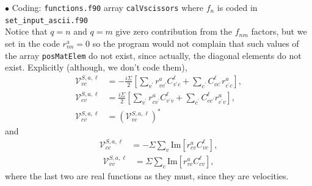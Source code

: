 $\bullet$ Coding: \verb=functions.f90= array \verb=calVscissors= 
where $f_n$ is coded in \verb=set_input_ascii.f90=\\
Notice that $q=n$ and $q=m$ give zero contribution from the $f_{nm}$
factors, but we set in the code $r^\mathrm{a}_{nn}=0$ so the program would
not complain that such values of the array \verb=posMatElem= do not
exist, since actually, the diagonal elements do not exist.
Explicitly (although, we don't code them), 
\begin{align}\label{vs.vc}
      \mathcal{V}^{S,a,\ell}_{vc}
&= 
      -\frac{i\Sigma}{2}
      \left[\sum_{v^{\prime}}r^{a}_{vv^{\prime}}C^{\ell}_{v^{\prime}c} 
          +
          \sum_{c^{\prime}}C^{\ell}_{vc^{\prime}}r^{a}_{c^{\prime}c}\right],
\nonumber\\
      \mathcal{V}^{S,a,\ell}_{cv}
&= 
      \frac{i\Sigma}{2}
      \left[\sum_{v^{\prime}}r^{a}_{cv^{\prime}}C^{\ell}_{v^{\prime}v} 
          + \sum_{c^{\prime}}C^{\ell}_{cc^{\prime}}r^{a}_{c^{\prime}v}\right],
\nonumber\\
      \mathcal{V}^{S,a,\ell}_{cv}
&= 
      (\mathcal{V}^{S,a,\ell}_{vc})^*
    \end{align}
and    
  \begin{align}\label{vs.cc}
    \mathcal{V}^{S,a,\ell}_{cc} 
    &= -\Sigma\sum_{v}
    \text{Im}\left[r^{a}_{cv}C^{\ell}_{vc}\right],
  \end{align}
 \begin{align}\label{vs.vv}
    \mathcal{V}^{S,a,\ell}_{vv} 
    &= \Sigma\sum_{c}
    \text{Im}\left[r^{a}_{vc}C^{\ell}_{cv}\right],
  \end{align}
where the last two are real functions as they must, since they are
velocities. 

